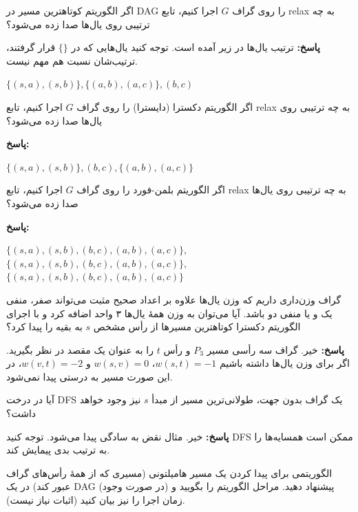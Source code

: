 \documentclass[12pt, a4paper]{article}
\newcommand{\vsp}{\vspace{34pt}}
\newcommand{\پاسخ}[2]{\color{answercolor}\textbf{پاسخ: }#2\color{black}\vspace{-0.3cm}}
\begin{document}
اگر الگوریتم کوتاهترین مسیر در DAG را روی گراف $G$ اجرا کنیم، تابع relax به چه ترتیبی روی یال‌ها صدا زده می‌شود؟

\پاسخ{\vsp\vsp}{
ترتیب یال‌ها در زیر آمده است. توجه کنید یال‌هایی که در $\{\}$ قرار گرفتند، ترتیب‌شان نسبت هم مهم نیست.
\begin{center}
$\{(s,a),(s,b)\},\{(a,b),(a,c)\},(b,c)$
\end{center}

}

اگر الگوریتم دکسترا (دایسترا) را روی گراف $G$ اجرا کنیم، تابع relax به چه ترتیبی روی یال‌ها صدا زده می‌شود؟


\پاسخ{\vsp\vsp}{
\begin{center}
$\{(s,a),(s,b)\},(b,c),\{(a,b),(a,c)\}$
\end{center}

}

اگر الگوریتم بلمن-فورد را روی گراف $G$ اجرا کنیم، تابع relax به چه ترتیبی روی یال‌ها صدا زده می‌شود؟

\پاسخ{\vsp\vsp}{
\begin{center}
$\{(s, a), (s,b), (b,c), (a,b), (a,c)\},$\\
$\{(s, a), (s,b), (b,c), (a,b), (a,c)\},$\\
$\{(s, a), (s,b), (b,c), (a,b), (a,c)\}$
\end{center}

}
	
گراف وزن‌داری داریم که وزن یال‌ها علاوه بر اعداد صحیح مثبت می‌تواند صفر، منفی یک و یا منفی دو باشد. آیا می‌توان به وزن همۀ یال‌ها ۳ واحد اضافه کرد و با اجرای الگوریتم دکسترا کوتاهترین مسیرها از رأس مشخص $s$ به بقیه را پیدا کرد؟

\پاسخ{\vsp\vsp}{
	خیر. گراف سه رأسی مسیر $P_3$ و رأس $t$ را به عنوان یک مقصد در نظر بگیرید. اگر برای وزن یال‌ها داشته باشیم $w(s,t)=-1$، $w(s,v)=0$ و $w(v,t)=-2$، در این صورت مسیر به درستی پیدا نمی‌شود.
	
}

آیا در درخت DFS یک گراف بدون جهت، طولانی‌ترین مسیر از مبدأ $s$ نیز وجود خواهد داشت؟

\پاسخ{\vsp\vsp}{
خیر. مثال نقض به سادگی پیدا می‌شود. توجه کنید DFS ممکن است همسایه‌ها را به ترتیب بدی پیمایش کند.
	
}

الگوریتمی برای پیدا کردن یک مسیر هامیلتونی (مسیری که از همۀ رأس‌های گراف عبور کند) در یک DAG (در صورت وجود) پیشنهاد دهید. مراحل الگوریتم را بگویید و زمان اجرا را نیز بیان کنید (اثبات نیاز نیست).
\end{document}
